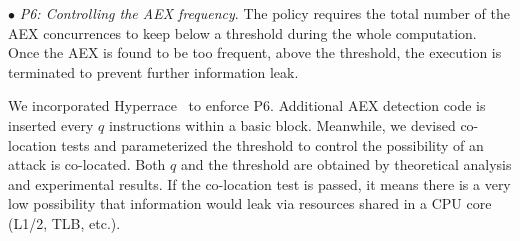 


\vspace{2pt}\noindent$\bullet$\textit{ P6: Controlling the AEX frequency}. The policy requires the total number of the AEX concurrences to keep below a threshold during the whole computation. Once the AEX is found to be too frequent, above the threshold, the execution is terminated to prevent further information leak.

We incorporated Hyperrace~\cite{chen2018racing} to enforce P6. Additional AEX detection code is inserted every $q$ instructions within a basic block. Meanwhile, we devised co-location tests and parameterized the threshold to control the possibility of an attack is co-located. Both $q$ and the threshold are obtained by theoretical analysis and experimental results. If the co-location test is passed, it means there is a very low possibility that information would leak via resources shared in a CPU core (L1/2, TLB, etc.).






